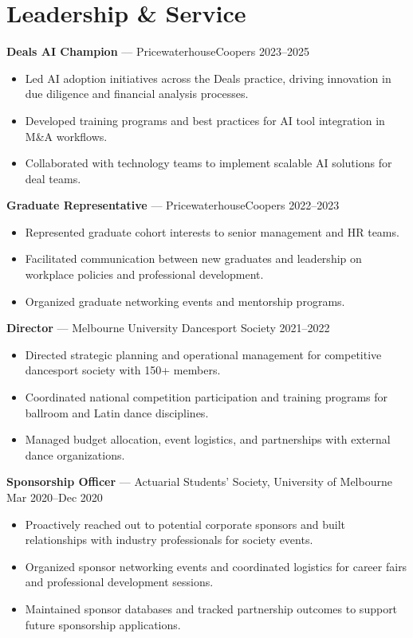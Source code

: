 \documentclass[10pt,letterpaper]{article}
\begin{document}
\section*{Leadership \& Service}

\textbf{Deals AI Champion} — PricewaterhouseCoopers \hfill 2023--2025\\[-1.5em]
\begin{itemize}
  \item Led AI adoption initiatives across the Deals practice, driving innovation in due diligence and financial analysis processes.
  \item Developed training programs and best practices for AI tool integration in M\&A workflows.
  \item Collaborated with technology teams to implement scalable AI solutions for deal teams.
\end{itemize}

\textbf{Graduate Representative} — PricewaterhouseCoopers \hfill 2022--2023\\[-1.5em]
\begin{itemize}
  \item Represented graduate cohort interests to senior management and HR teams.
  \item Facilitated communication between new graduates and leadership on workplace policies and professional development.
  \item Organized graduate networking events and mentorship programs.
\end{itemize}

\textbf{Director} — Melbourne University Dancesport Society \hfill 2021--2022\\[-1.5em]
\begin{itemize}
  \item Directed strategic planning and operational management for competitive dancesport society with 150+ members.
  \item Coordinated national competition participation and training programs for ballroom and Latin dance disciplines.
  \item Managed budget allocation, event logistics, and partnerships with external dance organizations.
\end{itemize}

\textbf{Sponsorship Officer} — Actuarial Students' Society, University of Melbourne \hfill Mar 2020--Dec 2020\\[-1.5em]
\begin{itemize}
  \item Proactively reached out to potential corporate sponsors and built relationships with industry professionals for society events.
  \item Organized sponsor networking events and coordinated logistics for career fairs and professional development sessions.
  \item Maintained sponsor databases and tracked partnership outcomes to support future sponsorship applications.
\end{itemize}
\end{document}
